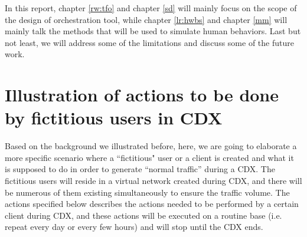 \documentclass[12pt]{report}
\begin{document}
In this report, chapter \ref{rw:tfo} and chapter \ref{sd} will mainly focus on the scope of the design of orchestration tool, while chapter \ref{lr:hwbs} and chapter \ref{mm} will mainly talk the methods that will be used to simulate human behaviors. Last but not least, we will address some of the limitations and discuss some of the future work.

\section{Illustration of actions to be done by fictitious users in CDX} \label{scenario}

Based on the background we illustrated before, here, we are going to elaborate a more specific scenario where a ``fictitious" user or a client is created and what it is supposed to do in order to generate “normal traffic” during a CDX. The fictitious users will reside in a virtual network created during CDX, and there will be numerous of them existing simultaneously to ensure the traffic volume. The actions specified below describes the actions needed to be performed by a certain client during CDX, and these actions will be executed on a routine base (i.e. repeat every day or every few hours) and will stop until the CDX ends.\\
\end{document}
